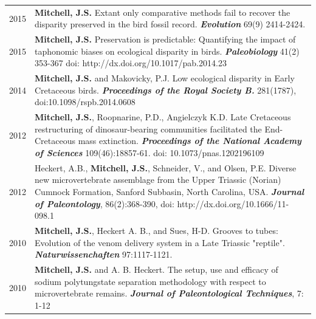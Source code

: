 \documentclass[a4paper, oneside, final]{scrartcl} %
\newcommand{\gray}{\rowcolor[gray]{.90}} %
\begin{document}
\begin{center}
\begin{tabularx}{0.97\linewidth}{>{\raggedleft\scshape}p{2cm}X}
 \gray 2015 & \textbf{Mitchell, J.S.} Extant only comparative methods fail to recover the disparity preserved in the bird fossil record. \textbf{\textit{Evolution}} 69(9) 2414-2424. \\
 2015 &  \textbf{Mitchell, J.S.} Preservation is predictable: Quantifying the impact of taphonomic biases on ecological disparity in birds. \textbf{\textit{Paleobiology}} 41(2) 353-367 doi: http://dx.doi.org/10.1017/pab.2014.23\\
\gray 2014 & \textbf{Mitchell, J.S.} and Makovicky, P.J. Low ecological disparity in Early Cretaceous birds. \textbf{\textit{Proceedings of the Royal Society B.}} 281(1787), doi:10.1098/rspb.2014.0608  \\
 2012 & \textbf{Mitchell, J.S.}, Roopnarine, P.D., Angielczyk K.D. Late Cretaceous restructuring of dinosaur-bearing communities facilitated the End-Cretaceous mass extinction. \textbf{\textit{Proceedings of the National Academy of Sciences}} 109(46):18857-61. doi: 10.1073/pnas.1202196109 \\
\gray 2012 & Heckert, A.B., \textbf{Mitchell, J.S.}, Schneider, V., and Olsen, P.E. Diverse new microvertebrate assemblage from the Upper Triassic (Norian) Cumnock Formation, Sanford Subbasin, North Carolina, USA. \textbf{\textit{Journal of Paleontology}}, 86(2):368-390, doi: http://dx.doi.org/10.1666/11-098.1\\
 2010 & \textbf{Mitchell, J.S.}, Heckert A. B., and Sues, H-D. Grooves to tubes: Evolution of the venom delivery system in a Late Triassic "reptile". \textbf{\textit{Naturwissenchaften}} 97:1117-1121.\\
\gray 2010 & \textbf{Mitchell, J.S.} and A. B. Heckert. The setup, use and efficacy of sodium polytungstate separation methodology with respect to microvertebrate remains. \textbf{\textit{Journal of Paleontological Techniques}}, 7: 1-12\\
\end{tabularx}



\end{center}
\end{document}
